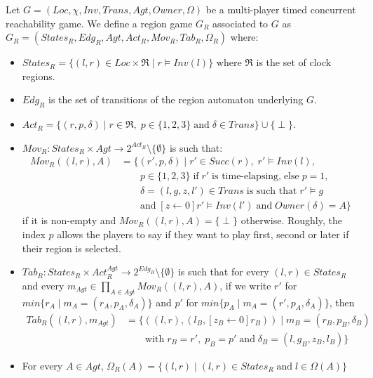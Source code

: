 \begin{definition}
Let $G = (Loc, \chi, Inv, Trans, Agt, Owner, \Omega)$ be a multi-player timed concurrent reachability game. We define a region game $G_{R}$ associated to $G$ as $G_{R} = (States_{R}, Edg_{R}, Agt, Act_{R}, Mov_{R}, Tab_{R}, \Omega_{R})$ where:
\begin{itemize}
\item $States_{R} = \lbrace (l, r) \in Loc \times \Re \; \vert \; r \models Inv(l) \rbrace$ where $\Re$ is the set of clock regions.
\item $Edg_{R}$ is the set of transitions of the region automaton underlying $G$.
\item $Act_{R} = \lbrace (r, p, \delta) \; \vert \; r \in \Re, \; p \in \lbrace 1, 2, 3 \rbrace \; \text{and} \; \delta \in Trans \rbrace \cup \lbrace \perp \rbrace$.
\item $Mov_{R}: States_{R} \times Agt \rightarrow 2^{Act_{R}} \setminus \lbrace \emptyset \rbrace$ is such that:
\begin{align*}
Mov_{R}((l, r), A) &= \Big\lbrace (r', p, \delta) \; \Big\vert \; r' \in Succ(r), \; r' \models Inv(l),\\
&\qquad p \in \lbrace 1, 2, 3 \rbrace \; \text{if} \; r' \; \text{is time-elapsing,} \; \text{else} \; p = 1,\\
&\qquad \delta = (l, g, z, l') \in Trans \; \text{is such that} \; r' \models g\\
&\qquad \text{and} \; [z \leftarrow 0]r' \models Inv(l') \; \text{and} \; Owner(\delta) = A \Big\rbrace
\end{align*}
if it is non-empty and $Mov_{R}((l, r), A) = \lbrace \perp \rbrace$ otherwise. Roughly, the index $p$ allows the players to say if they want to play first, second or later if their region is selected.
\item $Tab_{R}: States_{R} \times Act_{R}^{Agt} \rightarrow 2^{Edg_{R}} \setminus \lbrace \emptyset \rbrace$ is such that for every $(l, r) \in States_{R}$ and every $m_{Agt} \in \prod \limits_{A \in Agt} Mov_{R}((l, r), A)$, if we write $r'$ for $min\lbrace r_{A} \; \vert \; m_{A} = (r_{A}, p_{A}, \delta_{A}) \rbrace$ and $p'$ for $min\lbrace p_{A} \; \vert \; m_{A} = (r', p_{A}, \delta_{A}) \rbrace$, then
\begin{align*}
Tab_{R}((l, r), m_{Agt}) &= \Big\lbrace ((l, r), (l_{B}, [z_{B} \leftarrow 0]r_{B})) \; \Big\vert \; m_{B} = (r_{B}, p_{B}, \delta_{B})\\
&\qquad \text{with} \; r_{B} = r', \; p_{B} = p' \; \text{and} \; \delta_{B} = (l, g_{B}, z_{B}, l_{B}) \Big\rbrace
\end{align*}
\item For every $A \in Agt$, $\Omega_{R}(A) = \lbrace (l, r) \; \vert \; (l, r) \in States_{R} \; \text{and} \; l \in \Omega(A) \rbrace$
\end{itemize}
\end{definition}

